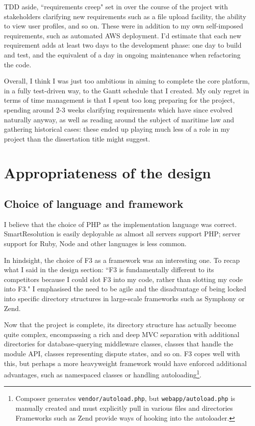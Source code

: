 TDD aside, ``requirements creep" set in over the course of the project with stakeholders clarifying new requirements such as a file upload facility, the ability to view user profiles, and so on. These were in addition to my own self-imposed requirements, such as automated AWS deployment. I'd estimate that each new requirement adds at least two days to the development phase: one day to build and test, and the equivalent of a day in ongoing maintenance when refactoring the code.

Overall, I think I was just too ambitious in aiming to complete the core platform, in a fully test-driven way, to the Gantt schedule that I created. My only regret in terms of time management is that I spent too long preparing for the project, spending around 2-3 weeks clarifying requirements which have since evolved naturally anyway, as well as reading around the subject of maritime law and gathering historical cases: these ended up playing much less of a role in my project than the dissertation title might suggest.

\section{Appropriateness of the design}

\subsection{Choice of language and framework}

I believe that the choice of PHP as the implementation language was correct. SmartResolution is easily deployable as almost all servers support PHP; server support for Ruby, Node and other languages is less common.

In hindsight, the choice of F3 as a framework was an interesting one. To recap what I said in the design section: ``F3 is fundamentally different to its competitors because I could slot F3 into my code, rather than slotting my code into F3." I emphasised the need to be agile and the disadvantage of being locked into specific directory structures in large-scale frameworks such as Symphony or Zend.

Now that the project is complete, its directory structure has actually become quite complex, encompassing a rich and deep MVC separation with additional directories for database-querying middleware classes, classes that handle the module API, classes representing dispute states, and so on. F3 copes well with this, but perhaps a more heavyweight framework would have enforced additional advantages, such as namespaced classes or handling autoloading\footnote{Composer generates \lstinline{vendor/autoload.php}, but \lstinline{webapp/autoload.php} is manually created and must explicitly pull in various files and directories Frameworks such as Zend provide ways of hooking into the autoloader.}.


